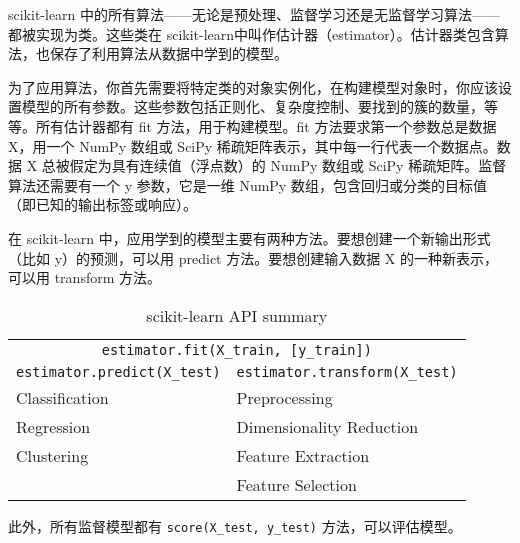 \begin{tcolorbox}[title=估计器接口小结]
    scikit-learn 中的所有算法——无论是预处理、监督学习还是无监督学习算法——都被实现为类。这些类在 scikit-learn中叫作估计器（estimator）。估计器类包含算法，也保存了利用算法从数据中学到的模型。

    为了应用算法，你首先需要将特定类的对象实例化，在构建模型对象时，你应该设置模型的所有参数。这些参数包括正则化、复杂度控制、要找到的簇的数量，等等。所有估计器都有 fit 方法，用于构建模型。fit 方法要求第一个参数总是数据 X，用一个 NumPy 数组或 SciPy 稀疏矩阵表示，其中每一行代表一个数据点。数据 X 总被假定为具有连续值（浮点数）的 NumPy 数组或 SciPy 稀疏矩阵。监督算法还需要有一个 y 参数，它是一维 NumPy 数组，包含回归或分类的目标值（即已知的输出标签或响应）。

    在 scikit-learn 中，应用学到的模型主要有两种方法。要想创建一个新输出形式（比如 y）的预测，可以用 predict 方法。要想创建输入数据 X 的一种新表示，可以用 transform 方法。
    \begin{table}[H]
        \centering
        \caption{scikit-learn API summary}
        \label{scikit-learn API summary}
        \begin{tabular}{ll}
            \hline
            \multicolumn{2}{c}{\texttt{estimator.fit(X\_train, [y\_train])}}      \\
            \verb|estimator.predict(X_test)| & \verb|estimator.transform(X_test)| \\
            \hline
            Classification                   & Preprocessing                      \\
            Regression                       & Dimensionality Reduction           \\
            Clustering                       & Feature Extraction                 \\
                                             & Feature Selection                  \\
            \hline
        \end{tabular}
    \end{table}
    此外，所有监督模型都有 \verb|score(X_test, y_test)| 方法，可以评估模型。
\end{tcolorbox}